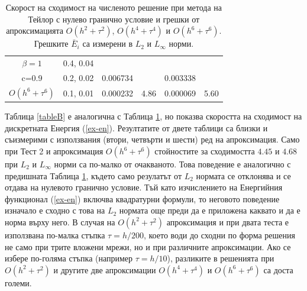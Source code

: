 \documentclass{article}
\newcommand{\rf}[1]{(\ref{#1})}
\begin{document}
\begin{table}[ht]
\begin{tabular}{||c|l|ll|ll||}
    \hline
  $\beta=1$     &0.4, 0.04   &            &          &                  &      \\
      c=0.9                    &0.2, 0.02   &0.006734 &           & 0.003338      &       \\
     $O(h^6+ \tau^6)$ &0.1, 0.01 & 0.000232 &4.86 & 0.000069  & 5.60        \\
	   \hline
			\hline 
		\end{tabular}
		\caption{Скорост на сходимост на численото решение при метода на Тейлор с нулево гранично условие и грешки от апроксимацията $O(h^{2} + \tau^2 )$, $O(h^{4} + \tau^4 )$ и $O(h^{6} + \tau^6 )$. Грешките $\bar E_i$ са измерени в $L_2$ и $L_\infty$ норми.}
\label{tableA}
\end{table}
Таблица \ref{tableB} е аналогична с Таблица \ref{tableA}, но показва скоростта на сходимост на дискретната Енергия \rf{ex-en}. Резултатите от двете таблици са близки и съизмерими с използвания (втори, четвърти и шести) ред на апроксимация. Само при  Тест 2 и апроксимация $O(h^6 + \tau^6)$ стойностите за сходимостта $4.45$ и $4.68$ при $L_2$ и $L_{\infty}$ норми са по-малко от очакваното. Това поведение е аналогично с предишната Таблица \ref{tableA}, където само резулатът от $L_2$ нормата се отклонява и се отдава на нулевото гранично условие. Тъй като изчислението на Енергийния функционал \rf{ex-en} включва квадратурни формули, то неговото поведение изначало е сходно с това на $L_2$ нормата още преди да е приложена каквато и да е норма върху него. В случая на $O(h^2 + \tau^2)$  апроксимация и при двата теста е използвана по-малка стъпка $\tau = h/200$, което води до сходни по форма решения не само при трите вложени мрежи, но и при различните апроксимации. Ако се избере по-голяма стъпка (например $\tau = h/10$), разликите в решенията при $O(h^2 + \tau^2)$ и другите две апроксимации $O(h^4 + \tau^4)$ и $O(h^6 + \tau^6)$ са доста големи.

\end{document}
